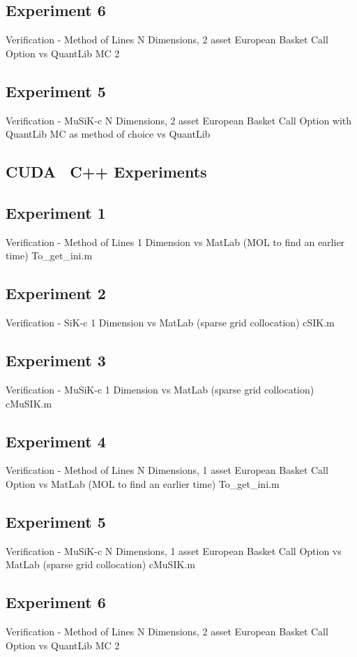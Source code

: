 \documentclass[a4paper]{amsart}
\begin{document}
\subsection{Experiment 6}
Verification - Method of Lines N Dimensions, 2 asset European Basket Call Option
vs QuantLib MC 2

\subsection{Experiment 5}
Verification - MuSiK-c N Dimensions, 2 asset European Basket Call Option with QuantLib MC as method of choice
vs QuantLib


\subsection{CUDA \ C++ Experiments}

\subsection{Experiment 1}
Verification - Method of Lines 1 Dimension
vs MatLab (MOL to find an earlier time) To_get_ini.m

\subsection{Experiment 2}
Verification - SiK-c 1 Dimension
vs MatLab (sparse grid collocation) cSIK.m

\subsection{Experiment 3}
Verification - MuSiK-c 1 Dimension
vs MatLab (sparse grid collocation) cMuSIK.m

\subsection{Experiment 4}
Verification - Method of Lines N Dimensions, 1 asset European Basket Call Option
vs MatLab (MOL to find an earlier time) To_get_ini.m

\subsection{Experiment 5}
Verification - MuSiK-c N Dimensions, 1 asset European Basket Call Option
vs MatLab (sparse grid collocation) cMuSIK.m

\subsection{Experiment 6}
Verification - Method of Lines N Dimensions, 2 asset European Basket Call Option
vs QuantLib MC 2
\end{document}
